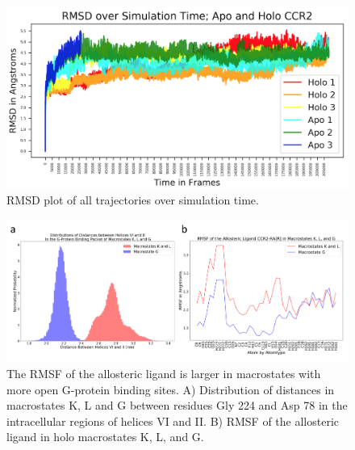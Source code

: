 \begin{figure}[htbp]
\begin{center}
\includegraphics[width=\textwidth]{./figures/rmsd.png}
\caption[RMSD of CCR2 trajectories over time]{RMSD plot of all trajectories over simulation time.}
\label{fig:rmsd}
\end{center}
\end{figure}

\begin{figure}[htbp]
  \begin{center}
  \includegraphics[width=\textwidth]{./figures/alloligand.png}
 \caption[Analysis of CCR2 allosteric ligand dynamics]{The RMSF of the allosteric ligand is larger in macrostates with more open G-protein binding sites. A) Distribution of distances in macrostates K, L and G between residues Gly 224 and Asp 78 in the intracellular regions of helices VI and II. B) RMSF of the allosteric ligand in holo macrostates K, L, and G.}
  \label{fig:alloligand}
\end{center}
\end{figure}

